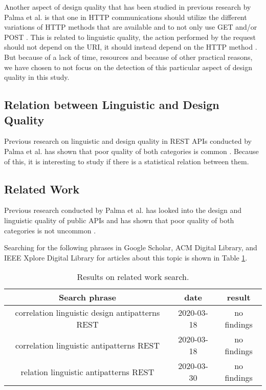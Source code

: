 Another aspect of design quality that has been studied in previous research by Palma et al. is that one in HTTP communications should utilize the different variations of HTTP methods that are available and to not only use GET and/or POST \cite{design}. This is related to linguistic quality, the action performed by the request should not depend on the URI, it should instead depend on the HTTP method \cite{linguistic}\cite{design}. But because of a lack of time, resources and because of other practical reasons, we have chosen to not focus on the detection of this particular aspect of design quality in this study. 


\subsection{Relation between Linguistic and Design Quality}

Previous research on linguistic and design quality in REST APIs conducted by Palma et al. has shown that poor quality of both categories is common \cite{linguistic}\cite{design}. Because of this, it is interesting to study if there is a statistical relation between them.


\subsection{Related Work}

Previous research conducted by Palma et al. has looked into the design and linguistic quality of public APIs and has shown that poor quality of both categories is not uncommon \cite{design}\cite{linguistic}.

Searching for the following phrases in Google Scholar, ACM Digital Library, and IEEE Xplore Digital Library for articles about this topic is shown in Table \ref{tab:Resultofrelatedworksearch}.

\begin{table}[!ht]
\begin{center}
\begin{tabular}{| c | c | c |}
\hline \textbf{Search phrase} & \textbf{date} & \textbf{result} \\
\hline 
correlation linguistic design antipatterns REST &
2020-03-18 & 
no findings
\\ \hline
correlation linguistic antipatterns REST &
2020-03-18 &
no findings
\\ \hline
relation linguistic antipatterns REST &
2020-03-30 & 
no findings
\\ \hline
\end{tabular}
 \caption{Results on related work search.}
 \label{tab:Resultofrelatedworksearch}
\end{center}
\end{table}


